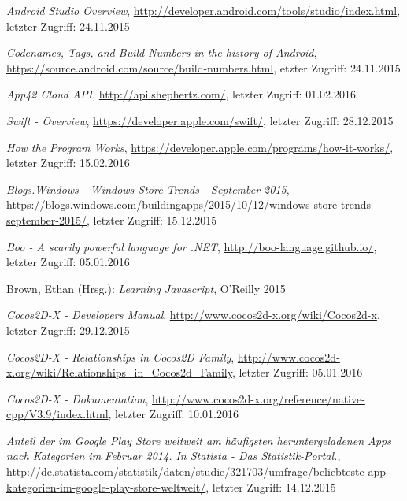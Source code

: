 \begin{thebibliography}{}

\emph{Android Studio Overview},
\url{http://developer.android.com/tools/studio/index.html}, letzter Zugriff: 24.11.2015

\emph{Codenames, Tags, and Build Numbers in the history of Android},
\url{https://source.android.com/source/build-numbers.html}, etzter Zugriff: 24.11.2015

\emph{App42 Cloud API},
\url{http://api.shephertz.com/}, letzter Zugriff: 01.02.2016

\emph{Swift - Overview},
\url{https://developer.apple.com/swift/}, letzter Zugriff: 28.12.2015

\emph{How the Program Works},
\url{https://developer.apple.com/programs/how-it-works/}, letzter Zugriff: 15.02.2016

\emph{Blogs.Windows - Windows Store Trends - September 2015},
\url{https://blogs.windows.com/buildingapps/2015/10/12/windows-store-trends-september-2015/}, letzter Zugriff: 15.12.2015

\emph{Boo - A scarily powerful language for .NET},
\url{http://boo-language.github.io/}, letzter Zugriff: 05.01.2016

Brown, Ethan (Hrsg.): 
\emph{Learning Javascript}, O'Reilly 2015

\emph{Cocos2D-X - Developers Manual},
\url{http://www.cocos2d-x.org/wiki/Cocos2d-x}, letzter Zugriff: 29.12.2015

\emph{Cocos2D-X - Relationships in Cocos2D Family},
\url{http://www.cocos2d-x.org/wiki/Relationships_in_Cocos2d_Family}, letzter Zugriff: 05.01.2016

\emph{Cocos2D-X - Dokumentation},
\url{http://www.cocos2d-x.org/reference/native-cpp/V3.9/index.html}, letzter Zugriff: 10.01.2016

\emph{Anteil der im Google Play Store weltweit am häufigsten heruntergeladenen Apps nach Kategorien im Februar 2014. In Statista - Das Statistik-Portal.},
\url{http://de.statista.com/statistik/daten/studie/321703/umfrage/beliebteste-app-kategorien-im-google-play-store-weltweit/}, letzter Zugriff: 14.12.2015


\end{thebibliography}
